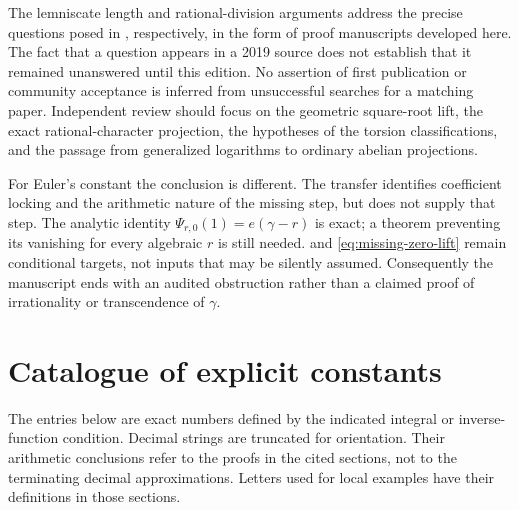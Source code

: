 \documentclass[11pt,a4paper]{article}
\numberwithin{equation}{section}
\theoremstyle{definition}
\theoremstyle{remark}
\begin{document}
The lemniscate length and rational-division arguments address the precise
questions posed in \cite[Remarks 8.16 and 5.7]{Tamiozzo}, respectively,
in the form of proof manuscripts developed here. The fact that a question
appears in a 2019 source does not establish that it remained unanswered
until this edition. No assertion of first publication or community
acceptance is inferred from unsuccessful searches for a matching paper.
Independent review should focus on the geometric square-root lift,
the exact rational-character projection, the hypotheses of the torsion
classifications, and the passage from generalized logarithms to ordinary
abelian projections.

For Euler's constant the conclusion is different. The transfer identifies
coefficient locking and the arithmetic nature of the missing step, but
does not supply that step. The analytic identity
$\Psi_{r,0}(1)=e(\gamma-r)$ is exact; a theorem preventing its vanishing
for every algebraic $r$ is still needed.  and
\eqref{eq:missing-zero-lift} remain conditional targets, not inputs that
may be silently assumed. Consequently the manuscript ends with an audited
obstruction rather than a claimed proof of irrationality or transcendence
of $\gamma$.

\appendix
\section{Catalogue of explicit constants}\label{app:catalogue}
The entries below are exact numbers defined by the indicated integral or
inverse-function condition. Decimal strings are truncated for orientation.
Their arithmetic conclusions refer to the proofs in the cited sections,
not to the terminating decimal approximations. Letters used for local
examples have their definitions in those sections.
\end{document}
